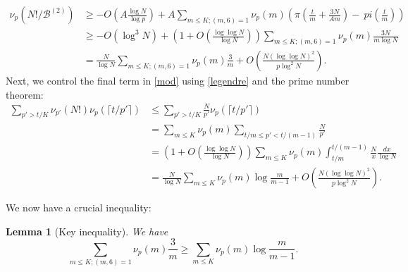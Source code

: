 \documentclass[12pt,a4paper,reqno]{amsart}
\numberwithin{equation}{section}
\theoremstyle{plain}
\newtheorem{lemma}[theorem]{Lemma}
\theoremstyle{definition}
\newcommand\tuple{{\mathcal B}}
\begin{document}
\begin{align*}
  \nu_p(N!/\tuple^{(2)}) &\geq
-O( A \frac{\log N}{\log p}) + A \sum_{m \leq K; (m,6)=1} \nu_p(m) \left(\pi\left(\frac{t}{m}+\frac{3N}{Am}\right) - \
pi\left(\frac{t}{m}\right)\right) \\
&\geq -O(\log^3 N) + \left(1 + O\left(\frac{\log \log N}{\log N}\right)\right) \sum_{m \leq K; (m,6)=1} \nu_p(m) \frac{3N}{m \log N} \\ 
&= \frac{N}{\log N} \sum_{m \leq K; (m,6)=1} \nu_p(m) \frac{3}{m} + O\left( \frac{N(\log\log N)^2}{p \log^2 N} \right).
\end{align*}
Next, we control the final term in \eqref{mod} using \eqref{legendre} and the prime number theorem:
\begin{align*}
  \sum_{p' > t/K} \nu_{p'}(N!) \nu_p(\lceil t/p' \rceil)
  &\leq \sum_{p' > t/K} \frac{N}{p'} \nu_p(\lceil t/p' \rceil) \\
  &= \sum_{m \leq K} \nu_p(m) \sum_{t/m \leq p' < t/(m-1)} \frac{N}{p'} \\
  &= \left(1 + O\left(\frac{\log\log N}{\log N}\right)\right)\sum_{m \leq K} \nu_p(m) \int_{t/m}^{t/(m-1)} \frac{N}{x} \frac{dx}{\log N} \\
  &= \frac{N}{\log N} \sum_{m \leq K} \nu_p(m) \log \frac{m}{m-1} + O\left( \frac{N(\log\log N)^2}{p \log^2 N} \right).
\end{align*}

We now have a crucial inequality:

\begin{lemma}[Key inequality] We have
$$ \sum_{m \leq K; (m,6)=1} \nu_p(m) \frac{3}{m}
\geq \sum_{m \leq K} \nu_p(m) \log \frac{m}{m-1}.$$
\end{lemma}
\end{document}
